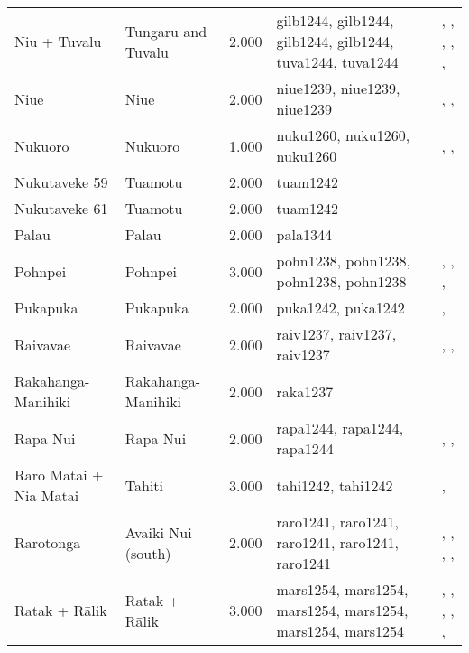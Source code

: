 \begin{longtable}{p{1.8cm}p{1.8cm}p{1.8cm}p{2cm}p{7cm}}
  Niu + Tuvalu & Tungaru and Tuvalu & 2.000 & gilb1244, gilb1244, gilb1244, gilb1244, tuva1244, tuva1244 & \citet{lambert1966}, \citet{lambert1975makin}, \citet{lambert1991}, \citet{macdonald1982cinderellas}, \citet{macdonald1982cinderellas}, \citet{goldsmith1991} \\ 
  Niue & Niue & 2.000 & niue1239, niue1239, niue1239 & \citet{loeb1978}, \citet{smith1983niue}, \citet{walter_anderson1995} \\ 
  Nukuoro & Nukuoro & 1.000 & nuku1260, nuku1260, nuku1260 & \citet{carroll1966nukuoro}, \citet{carroll1975pacific}, \citet{eilers_1934} \\ 
  Nukutaveke 59 & Tuamotu & 2.000 & tuam1242 & \citet{emory1975material} \\ 
  Nukutaveke 61 & Tuamotu & 2.000 & tuam1242 & \citet{emory1975material} \\ 
  Palau & Palau & 2.000 & pala1344 & \citet{force1960leadership} \\ 
  Pohnpei & Pohnpei & 3.000 & pohn1238, pohn1238, pohn1238, pohn1238 & \citet{hanlon2019upon}, \citet{haun1984prehistoric}, \citet{raynor1991indigenous}, \citet{riesenberg1968native} \\ 
  Pukapuka & Pukapuka & 2.000 & puka1242, puka1242 & \citet{beagleholeandbeaglehole1938}, \citet{macgregor1935} \\ 
  Raivavae & Raivavae & 2.000 & raiv1237, raiv1237, raiv1237 & \citet{aitken1930ethnology}, \citet{bollt2008excavations}, \citet{edwards2003archaeological} \\ 
  Rakahanga-Manihiki & Rakahanga-Manihiki & 2.000 & raka1237 & \citet{buck1932a} \\ 
  Rapa Nui & Rapa Nui & 2.000 & rapa1244, rapa1244, rapa1244 & \citet{sahlins1958social}, \citet{kirch1984evolution}, \citet{metraux_1971} \\ 
  Raro Matai + Nia Matai & Tahiti & 3.000 & tahi1242, tahi1242 & \citet{oliver2019ancient}, \citet{oliver2019ancient} \\ 
  Rarotonga & Avaiki Nui (south) & 2.000 & raro1241, raro1241, raro1241, raro1241, raro1241 & \citet{bellwood1971varieties}, \citet{buck1934}, \citet{crocombe_1967}, \citet{hayes1981cook}, \citet{walter1996} \\ 
  Ratak + Rālik & Ratak + Rālik & 3.000 & mars1254, mars1254, mars1254, mars1254, mars1254, mars1254 & \citet{carruci1991marshall}, \citet{carruci1991marshall}, \citet{erdland1914}, \citet{erdland1914}, \citet{williamson_1982}, \citet{williamson_1982} \\ 

\end{longtable}
